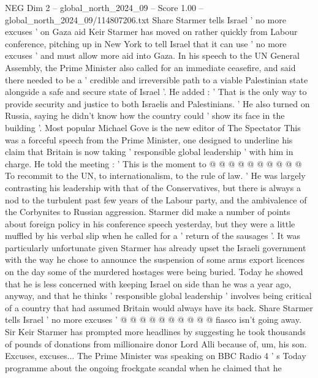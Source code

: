 \begin{textsample}{NEG Dim 2 – global\_north\_2024\_09 – Score 1.00 – global\_north\_2024\_09/114807206.txt}  \label{ex:f2_neg_316}
Share Starmer tells Israel ' no more excuses ' on Gaza aid Keir Starmer has moved on rather quickly from Labour conference, pitching up in New York to tell Israel that it can use ' no more excuses ' and must allow more aid into Gaza.
In his speech to the UN General Assembly, the Prime Minister also called for an immediate ceasefire, and said there needed to be a ' credible and irreversible path to a viable Palestinian state alongside a safe and secure state of Israel '.
He added : ' That is the only way to provide security and justice to both Israelis and Palestinians. ' He also turned on Russia, saying he didn't know how the country could ' show its face in the building '.
Most popular Michael Gove is the new editor of The Spectator This was a forceful speech from the Prime Minister, one designed to underline his claim that Britain is now taking ' responsible global leadership ' with him in charge.
He told the meeting : ' This is the moment to @ @ @ @ @ @ @ @ @ @ To recommit to the UN, to internationalism, to the rule of law. ' He was largely contrasting his leadership with that of the Conservatives, but there is always a nod to the turbulent past few years of the Labour party, and the ambivalence of the Corbynites to Russian aggression.
Starmer did make a number of points about foreign policy in his conference speech yesterday, but they were a little muffled by his verbal slip when he called for a ' return of the sausages '.
It was particularly unfortunate given Starmer has already upset the Israeli government with the way he chose to announce the suspension of some arms export licences on the day some of the murdered hostages were being buried.
Today he showed that he is less concerned with keeping Israel on side than he was a year ago, anyway, and that he thinks ' responsible global leadership ' involves being critical of a country that had assumed Britain would always have its back.
Share Starmer tells Israel ' no more excuses ' @ @ @ @ @ @ @ @ @ @ fiasco isn't going away.
Sir Keir Starmer has prompted more headlines by suggesting he took thousands of pounds of donations from millionaire donor Lord Alli because of, um, his son.
Excuses, excuses...
The Prime Minister was speaking on BBC Radio 4 ' s Today programme about the ongoing frockgate scandal when he claimed that he

\end{textsample}
